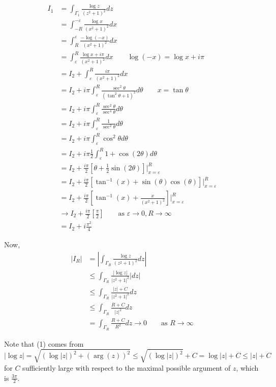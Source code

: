 \documentclass[12pt]{Qual}
\begin{document}
\begin{solution}
\begin{align*}
    I_1&=\int_{\Gamma_1}\frac{\log z}{(z^2+1)^2}dz\\
    &=\int_{-R}^{-\varepsilon}\frac{\log x}{(x^2+1)^2}dx\\
    &=\int_R^\varepsilon\frac{-\log(-x)}{(x^2+1)^2}dx\\
    &=\int_\varepsilon^R\frac{\log x+i\pi}{(x^2+1)^2}dx\qquad \log(-x)=\log x+i\pi\\
    &=I_2+\int_\varepsilon^R\frac{i\pi}{(x^2+1)^2}dx\\
    &=I_2+i\pi\int_\varepsilon^R\frac{\sec^2\theta}{(\tan^2\theta+1)^2}d\theta\qquad x=\tan\theta\\
    &=I_2+i\pi\int_\varepsilon^R\frac{\sec^2\theta}{\sec^4\theta}d\theta\\
    &=I_2+i\pi\int_\varepsilon^R\frac{1}{\sec^2\theta}d\theta\\
    &=I_2+i\pi\int_\varepsilon^R\cos^2\theta d\theta\\
    &=I_2+i\pi\frac{1}{2}\int_\varepsilon^R1+\cos(2\theta) d\theta\\
    &=I_2+\frac{i\pi}{2}\left[\theta+\frac{1}{2}\sin(2\theta)\right]\Big|_{x=\varepsilon}^R\\
    &=I_2+\frac{i\pi}{2}\left[\tan^{-1}(x)+\sin(\theta)\cos(\theta)\right]\Big|_{x=\varepsilon}^R\\
    &=I_2+\frac{i\pi}{2}\left[\tan^{-1}(x)+\frac{x}{(x^2+1)^2}\right]\Big|_{x=\varepsilon}^R\\
    &\to I_2+\frac{i\pi}{2}\left[\frac{\pi}{2}\right]\qquad\text{as }\varepsilon\to0,R\to\infty\\
    &=I_2+i\frac{\pi^2}{4}
\end{align*}



Now, \begin{align*}
    |I_R|&=\left|\int_{\Gamma_R}\frac{\log z}{(z^2+1)^2}dz\right|\\
    &\le \int_{\Gamma_R}\frac{|\log z|}{|z^2+1|^2}|dz|\\
    &\le\int_{\Gamma_R}\frac{|z|+C}{|z^2+1|^2}dz\tag{1}\\
    &\le\int_{\Gamma_R}\frac{R+C}{|z|^2}dz\tag{2}\\
    &=\int_{\Gamma_R}\frac{R+C}{R^2}dz\to0\qquad\text{as }R\to\infty
\end{align*}

Note that (1) comes from $$|\log z|=\sqrt{(\log |z|)^2+(\arg(z))^2}\le \sqrt{(\log|z|)^2}+C=\log|z|+C\le |z|+C$$ for $C$ sufficiently large with respect to the maximal possible argument of $z$, which is $\frac{3\pi}{2}.$


\end{solution}
\end{document}
